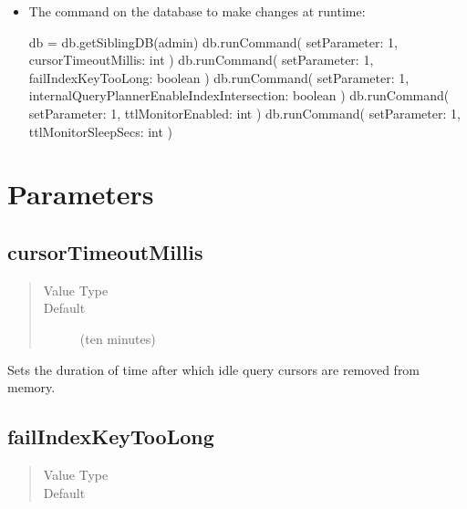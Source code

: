 \documentclass[letterpaper,10pt,english]{sphinxmanual}
\begin{document}
\begin{itemize}
\item {} 
\sphinxAtStartPar
The  command on the  database
to make changes at runtime:

\begin{sphinxVerbatim}[commandchars=\\\{\}]
\PYGZgt{} db = db.getSiblingDB(\PYGZsq{}admin\PYGZsq{})
\PYGZgt{} db.runCommand( \PYGZob{} setParameter: 1, cursorTimeoutMillis: \PYGZlt{}int\PYGZgt{} \PYGZcb{} )
\PYGZgt{} db.runCommand( \PYGZob{} setParameter: 1, failIndexKeyTooLong: \PYGZlt{}boolean\PYGZgt{} \PYGZcb{} )
\PYGZgt{} db.runCommand( \PYGZob{} setParameter: 1, internalQueryPlannerEnableIndexIntersection: \PYGZlt{}boolean\PYGZgt{} \PYGZcb{} )
\PYGZgt{} db.runCommand( \PYGZob{} setParameter: 1, ttlMonitorEnabled: \PYGZlt{}int\PYGZgt{} \PYGZcb{} )
\PYGZgt{} db.runCommand( \PYGZob{} setParameter: 1, ttlMonitorSleepSecs: \PYGZlt{}int\PYGZgt{} \PYGZcb{} )
\end{sphinxVerbatim}

\end{itemize}


\section{Parameters}
\label{\detokenize{set-parameter:parameters}}

\subsection{cursorTimeoutMillis}
\label{\detokenize{set-parameter:cursortimeoutmillis}}\begin{quote}\begin{description}
\item[{Value Type}] \leavevmode
\sphinxAtStartPar
{}

\item[{Default}] \leavevmode
\sphinxAtStartPar
{} (ten minutes)

\end{description}\end{quote}

\sphinxAtStartPar
Sets the duration of time after which idle query cursors
are removed from memory.


\subsection{failIndexKeyTooLong}
\label{\detokenize{set-parameter:failindexkeytoolong}}\begin{quote}\begin{description}
\item[{Value Type}] \leavevmode
\sphinxAtStartPar
{}

\item[{Default}] \leavevmode
\sphinxAtStartPar
{}

\end{description}\end{quote}
\end{document}
